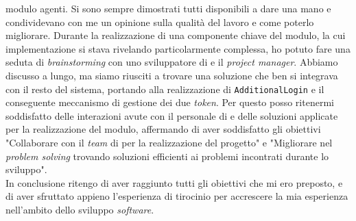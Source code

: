 modulo agenti. Si sono sempre dimostrati tutti disponibili a dare una mano e condividevano con me un opinione sulla 
qualità del lavoro e come poterlo migliorare. Durante la realizzazione di una componente chiave del modulo, la cui 
implementazione si stava rivelando particolarmente complessa, ho potuto fare una seduta di \textit{brainstorming} con 
uno sviluppatore di {\movi} e il \textit{project manager}. Abbiamo discusso a lungo, ma siamo riusciti a trovare 
una soluzione che ben si integrava con il resto del sistema, portando alla realizzazione di \texttt{AdditionalLogin} 
e il conseguente meccanismo di gestione dei due \textit{token}. Per questo posso ritenermi soddisfatto delle 
interazioni avute con il personale di {\company} e delle soluzioni applicate per la realizzazione del modulo, 
affermando di aver soddisfatto gli obiettivi "Collaborare con il \textit{team} di {\company} per 
la realizzazione del progetto" e "Migliorare nel \textit{problem solving} trovando soluzioni efficienti ai problemi 
incontrati durante lo sviluppo".\\
In conclusione ritengo di aver raggiunto tutti gli obiettivi che mi ero preposto, e di aver sfruttato appieno l'esperienza 
di tirocinio per accrescere la mia esperienza nell'ambito dello sviluppo \textit{software}.